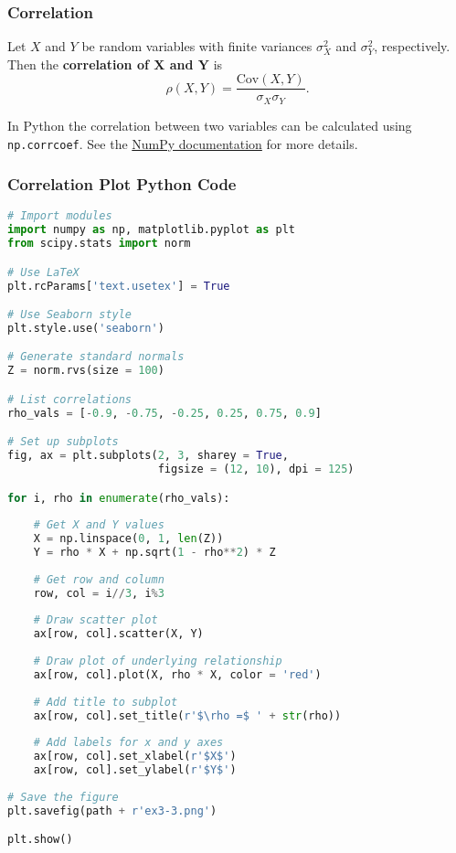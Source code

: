 \documentclass{beamer}
\begin{document}
\begin{frame}
\frametitle{Correlation}
\begin{Definition} 
Let $X$ and $Y$ be random variables with finite variances $\sigma_X^2$ and $\sigma_Y^2$, respectively. Then the {\bf correlation of $\boldsymbol X$ and $\boldsymbol Y$} is
$$
\rho(X, Y) = \frac{\text{Cov}(X, Y)}{\sigma_X\sigma_Y}.
$$
\end{Definition}
In Python the correlation between two variables can be calculated using \texttt{np.corrcoef}. See the \href{https://numpy.org/doc/stable/reference/generated/numpy.corrcoef.html}{NumPy documentation} for more details.
\end{frame}

\begin{frame}[fragile]
\frametitle{Correlation Plot Python Code}
\begin{multicols}{2}
\begin{lstlisting}[language=Python]
# Import modules
import numpy as np, matplotlib.pyplot as plt
from scipy.stats import norm

# Use LaTeX
plt.rcParams['text.usetex'] = True

# Use Seaborn style
plt.style.use('seaborn')

# Generate standard normals
Z = norm.rvs(size = 100)

# List correlations
rho_vals = [-0.9, -0.75, -0.25, 0.25, 0.75, 0.9]

# Set up subplots
fig, ax = plt.subplots(2, 3, sharey = True, 
                       figsize = (12, 10), dpi = 125)

for i, rho in enumerate(rho_vals):
    
    # Get X and Y values
    X = np.linspace(0, 1, len(Z))
    Y = rho * X + np.sqrt(1 - rho**2) * Z
    
    # Get row and column
    row, col = i//3, i%3
    
    # Draw scatter plot
    ax[row, col].scatter(X, Y)
    
    # Draw plot of underlying relationship
    ax[row, col].plot(X, rho * X, color = 'red')
    
    # Add title to subplot
    ax[row, col].set_title(r'$\rho =$ ' + str(rho))
    
    # Add labels for x and y axes
    ax[row, col].set_xlabel(r'$X$')
    ax[row, col].set_ylabel(r'$Y$')
    
# Save the figure
plt.savefig(path + r'ex3-3.png')

plt.show()
\end{lstlisting}
\end{multicols}
\end{frame}
\end{document}
